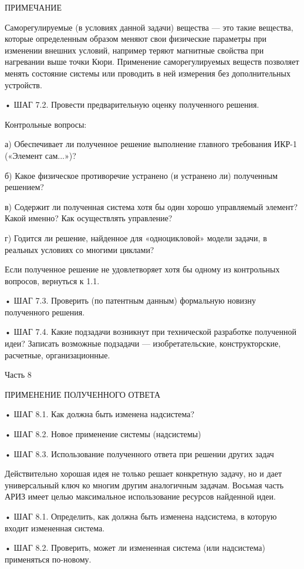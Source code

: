 ПРИМЕЧАНИЕ

Саморегулируемые  (в  условиях данной  задачи)  вещества  — это  такие
вещества,   которые  определенным   образом  меняют   свои  физические
параметры  при изменении  внешних условий,  например теряют  магнитные
свойства при  нагревании выше точки Кюри.  Применение саморегулируемых
веществ  позволяет  менять  состояние  системы  или  проводить  в  ней
измерения без дополнительных устройств.

• ШАГ 7.2. Провести предварительную оценку полученного решения.

Контрольные вопросы:

а) Обеспечивает  ли полученное решение выполнение  главного требования
ИКР-1 («Элемент сам...»)?

б) Какое физическое противоречие устранено (и устранено ли) полученным
решением?

в)  Содержит ли  полученная система  хотя бы  один хорошо  управляемый
элемент? Какой именно? Как осуществлять управление?

г) Годится ли  решение, найденное для «одноцикловой»  модели задачи, в
реальных условиях со многими циклами?

Если полученное решение не удовлетворяет хотя бы одному из контрольных
вопросов, вернуться к 1.1.

•  ШАГ  7.3.  Проверить   (по  патентным  данным)  формальную  новизну
полученного решения.

•  ШАГ  7.4.  Какие  подзадачи возникнут  при  технической  разработке
полученной  идеи?  Записать  возможные подзадачи  —  изобретательские,
конструкторские, расчетные, организационные.




Часть 8

ПРИМЕНЕНИЕ ПОЛУЧЕННОГО ОТВЕТА

• ШАГ 8.1. Как должна быть изменена надсистема?

• ШАГ 8.2. Новое применение системы (надсистемы)

• ШАГ 8.3. Использование полученного ответа при решении других задач

Действительно хорошая  идея не только  решает конкретную задачу,  но и
дает универсальный ключ ко  многим другим аналогичным задачам. Восьмая
часть АРИЗ  имеет целью максимальное использование  ресурсов найденной
идеи.


• ШАГ 8.1. Определить, как  должна быть изменена надсистема, в которую
входит измененная система.

• ШАГ  8.2. Проверить,  может ли  измененная система  (или надсистема)
применяться по-новому.

